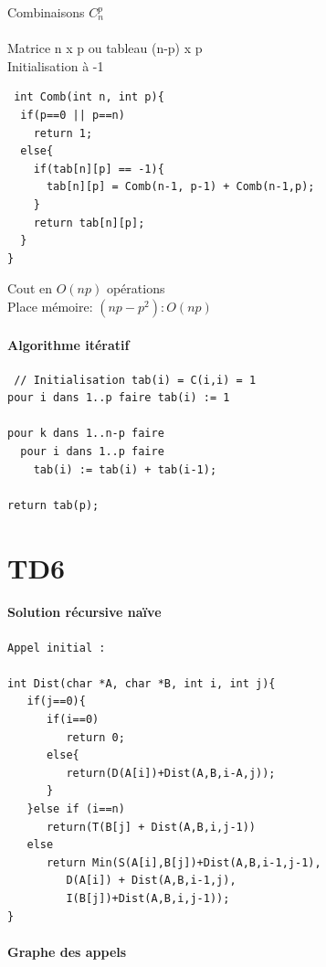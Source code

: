 \begin{exercice}{Combinaisons $C_n^p$}
\paragraph{}
Matrice n x p ou tableau (n-p) x p\\
Initialisation à -1

\begin{verbatim}
 int Comb(int n, int p){
  if(p==0 || p==n)
    return 1;
  else{
    if(tab[n][p] == -1){
      tab[n][p] = Comb(n-1, p-1) + Comb(n-1,p);
    }
    return tab[n][p];
  }
}
\end{verbatim}

Cout en $O(np)$ opérations\\
Place mémoire: $(np - p^2) : O(np)$

\paragraph{Algorithme itératif}
\begin{verbatim}
 // Initialisation tab(i) = C(i,i) = 1
pour i dans 1..p faire tab(i) := 1

pour k dans 1..n-p faire
  pour i dans 1..p faire
    tab(i) := tab(i) + tab(i-1);

return tab(p);
\end{verbatim}



\end{exercice}

\section{TD6}

\paragraph{Solution récursive naïve}

\begin{verbatim}
Appel initial :

int Dist(char *A, char *B, int i, int j){
   if(j==0){
      if(i==0)
         return 0;
      else{
         return(D(A[i])+Dist(A,B,i-A,j));
      }
   }else if (i==n)
      return(T(B[j] + Dist(A,B,i,j-1))
   else
      return Min(S(A[i],B[j])+Dist(A,B,i-1,j-1),
         D(A[i]) + Dist(A,B,i-1,j),
         I(B[j])+Dist(A,B,i,j-1));
}
\end{verbatim}        	
	
\paragraph{Graphe des appels}

